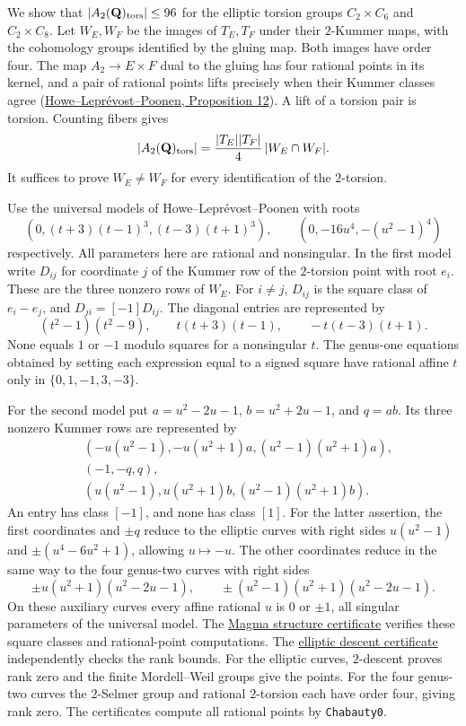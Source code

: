 \documentclass[11pt]{article}
\begin{document}
We show that $|A_2(\mathbf Q)_{\rm tors}|\le96$ for the elliptic torsion groups $C_2\times C_6$ and $C_2\times C_8$. Let $W_E,W_F$ be the images of $T_E,T_F$ under their $2$-Kummer maps, with the cohomology groups identified by the gluing map. Both images have order four. The map $A_2\to E\times F$ dual to the gluing has four rational points in its kernel, and a pair of rational points lifts precisely when their Kummer classes agree (\href{https://math.mit.edu/~poonen/papers/large.pdf}{Howe--Leprévost--Poonen, Proposition 12}). A lift of a torsion pair is torsion. Counting fibers gives
\[
 |A_2(\mathbf Q)_{\rm tors}|=\frac{|T_E||T_F|}{4}\,|W_E\cap W_F|.
\]
It suffices to prove $W_E\ne W_F$ for every identification of the $2$-torsion.

Use the universal models of Howe--Leprévost--Poonen with roots
\[
 (0,(t+3)(t-1)^3,(t-3)(t+1)^3),\qquad (0,-16u^4,-(u^2-1)^4)
\]
respectively. All parameters here are rational and nonsingular. In the first model write $D_{ij}$ for coordinate $j$ of the Kummer row of the $2$-torsion point with root $e_i$. These are the three nonzero rows of $W_E$. For $i\ne j$, $D_{ij}$ is the square class of $e_i-e_j$, and $D_{ji}=[-1]D_{ij}$. The diagonal entries are represented by
\[
 (t^2-1)(t^2-9),\qquad t(t+3)(t-1),\qquad -t(t-3)(t+1).
\]
None equals $1$ or $-1$ modulo squares for a nonsingular $t$. The genus-one equations obtained by setting each expression equal to a signed square have rational affine $t$ only in $\{0,1,-1,3,-3\}$.

For the second model put $a=u^2-2u-1$, $b=u^2+2u-1$, and $q=ab$. Its three nonzero Kummer rows are represented by
\[
\begin{split}
 &(-u(u^2-1),-u(u^2+1)a,(u^2-1)(u^2+1)a),\\
 &(-1,-q,q),\\
 &(u(u^2-1),u(u^2+1)b,(u^2-1)(u^2+1)b).
\end{split}
\]
An entry has class $[-1]$, and none has class $[1]$. For the latter assertion, the first coordinates and $\pm q$ reduce to the elliptic curves with right sides $u(u^2-1)$ and $\pm(u^4-6u^2+1)$, allowing $u\mapsto -u$. The other coordinates reduce in the same way to the four genus-two curves with right sides
\[
 \pm u(u^2+1)(u^2-2u-1),\qquad \pm(u^2-1)(u^2+1)(u^2-2u-1).
\]
On these auxiliary curves every affine rational $u$ is $0$ or $\pm1$, all singular parameters of the universal model. The \href{https://genus-2-torsion.github.io/data/knowledge/sources/record_glue2_structure_certificate.m}{Magma structure certificate} verifies these square classes and rational-point computations. The \href{https://genus-2-torsion.github.io/data/knowledge/sources/record_structural_local_certificate.m}{elliptic descent certificate} independently checks the rank bounds. For the elliptic curves, $2$-descent proves rank zero and the finite Mordell--Weil groups give the points. For the four genus-two curves the $2$-Selmer group and rational $2$-torsion each have order four, giving rank zero. The certificates compute all rational points by \texttt{Chabauty0}.
\end{document}
